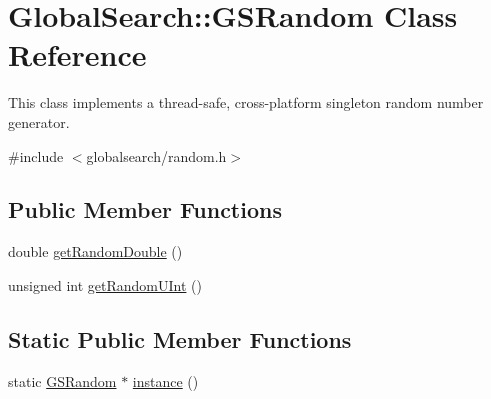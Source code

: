 \hypertarget{classGlobalSearch_1_1GSRandom}{}\section{Global\+Search\+:\+:G\+S\+Random Class Reference}
\label{classGlobalSearch_1_1GSRandom}


This class implements a thread-\/safe, cross-\/platform singleton random number generator.  




{\ttfamily \#include $<$globalsearch/random.\+h$>$}

\subsection*{Public Member Functions}
\begin{DoxyCompactItemize}
\item 
double \hyperlink{classGlobalSearch_1_1GSRandom_ae648223ac2769459d66f446ac862955e}{get\+Random\+Double} ()
\item 
unsigned int \hyperlink{classGlobalSearch_1_1GSRandom_a225a2c9598d7d6636afecacdd7750228}{get\+Random\+U\+Int} ()
\end{DoxyCompactItemize}
\subsection*{Static Public Member Functions}
\begin{DoxyCompactItemize}
\item 
static \hyperlink{classGlobalSearch_1_1GSRandom}{G\+S\+Random} $\ast$ \hyperlink{classGlobalSearch_1_1GSRandom_a19c0a95c0f92f3ffedfbcb4e4f15a782}{instance} ()
\end{DoxyCompactItemize}
